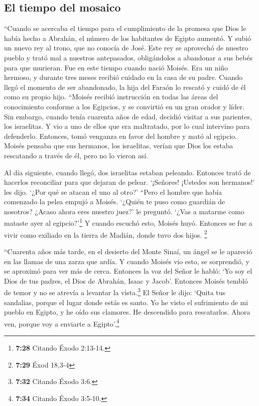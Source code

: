 \hypertarget{el-tiempo-del-mosaico}{%
\subsection{El tiempo del mosaico}\label{el-tiempo-del-mosaico}}

 ``Cuando se acercaba el tiempo para el cumplimiento de
la promesa que Dios le había hecho a Abrahán, el número de los
habitantes de Egipto aumentó.  Y subió un nuevo rey al
trono, que no conocía de José.  Este rey se aprovechó de
nuestro pueblo y trató mal a nuestros antepasados, obligándolos a
abandonar a sus bebés para que murieran.  Fue en este
tiempo cuando nació Moisés. Era un niño hermoso, y durante tres meses
recibió cuidado en la casa de su padre.  Cuando llegó el
momento de ser abandonado, la hija del Faraón lo rescató y cuidó de él
como su propio hijo.  ``Moisés recibió instrucción en
todas las áreas del conocimiento conforme a los Egipcios, y se convirtió
en un gran orador y líder.  Sin embargo, cuando tenía
cuarenta años de edad, decidió visitar a sus parientes, los israelitas.
 Y vio a uno de ellos que era maltratado, por lo cual
intervino para defenderlo. Entonces, tomó venganza en favor del hombre y
mató al egipcio.  Moisés pensaba que sus hermanos, los
israelitas, verían que Dios los estaba rescatando a través de él, pero
no lo vieron así.

 Al día siguiente, cuando llegó, dos israelitas estaban
peleando. Entonces trató de hacerlos reconciliar para que dejaran de
pelear. `¡Señores! ¡Ustedes son hermanos!' les dijo. `¿Por qué se atacan
el uno al otro?'  ``Pero el hombre que había comenzado la
pelea empujó a Moisés. `¿Quién te puso como guardián de nosotros? ¿Acaso
ahora eres nuestro juez?' le preguntó.  `¿Vas a matarme
como mataste ayer al egipcio?'\footnote{\textbf{7:28} Citando Éxodo
  2:13-14.}  Y cuando escuchó esto, Moisés huyó. Entonces
se fue a vivir como exiliado en la tierra de Madián, donde tuvo dos
hijos. \footnote{\textbf{7:29} Éxod 18,3-4}

 ``Cuarenta años más tarde, en el desierto del Monte
Sinaí, un ángel se le apareció en las llamas de una zarza que ardía.
 Y cuando Moisés vio esto, se sorprendió, y se aproximó
para ver más de cerca. Entonces la voz del Señor le habló:
 `Yo soy el Dios de tus padres, el Dios de Abrahán, Isaac
y Jacob'. Entonces Moisés tembló de temor y no se atrevía a levantar la
vista.\footnote{\textbf{7:32} Citando Éxodo 3:6.}  El
Señor le dijo: `Quita tus sandalias, porque el lugar donde estás es
santo.  Yo he visto el sufrimiento de mi pueblo en
Egipto, y he oído sus clamores. He descendido para rescatarlos. Ahora
ven, porque voy a enviarte a Egipto'.\footnote{\textbf{7:34} Citando
  Éxodo 3:5-10.}

